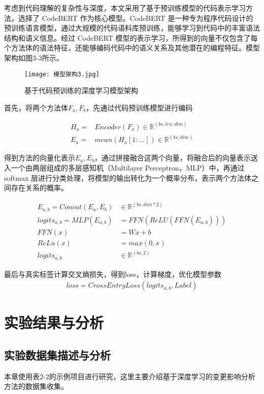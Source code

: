 考虑到代码理解的复杂性与深度，本文采用了基于预训练模型的代码表示学习方法，选择了 CodeBERT 作为核心模型。CodeBERT 是一种专为程序代码设计的预训练语言模型，通过大规模的代码语料库预训练，能够学习到代码中的丰富语法结构和语义信息。经过 CodeBERT 模型的表示学习，所得到的向量不仅包含了每个方法体的语法特征，还能够编码代码中的语义关系及其他潜在的编程特征。模型架构如图3-3所示。

\begin{figure}[h]
\centering
\texttt{[image: 模型架构3.jpg]}
\caption{基于代码预训练的深度学习模型架构}
\end{figure}


首先，将两个方法体$ F_a, F_b$，先通过代码预训练模型进行编码

\begin{align}
H_a=&Encoder(F_a) \in \mathbb{R}^{(bs,len,dim)} \\
E_a=&mean(H_a[1:...]) \in \mathbb{R}^{(bs,dim)}
\end{align}

得到方法的向量化表示$ E_a, E_b$，通过拼接融合这两个向量，将融合后的向量表示送入一个由两层组成的多层感知机（Multilayer Perceptron，MLP）中，再通过 softmax 层进行分类处理，将模型的输出转化为一个概率分布，表示两个方法体之间存在关系的概率。

\begin{align}
E_{a,b}=Concat(E_a,E_b)& \in \mathbb{R}^{(bs,dim*2)} \\
logits_{a,b}=MLP(E_{a,b})&=FFN(ReLU(FFN(E_{a,b}))) \\
FFN(x)&=Wx+b\\
ReLu(x)&=max(0,x)\\
logits_{a,b}& \in \mathbb{R}^{(bs,2)}
\end{align}

最后与真实标签计算交叉熵损失，得到loss，计算梯度，优化模型参数
\begin{align}
loss=CrossEntryLoss(logits_{a,b}, Label)
\end{align}

\section{实验结果与分析}

\subsection{实验数据集描述与分析}

本章使用表2-2的示例项目进行研究，这里主要介绍基于深度学习的变更影响分析方法的数据集收集。

